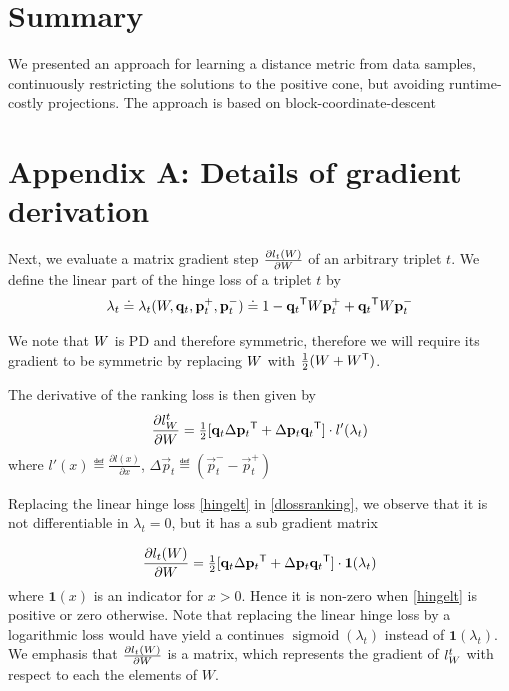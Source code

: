 \documentclass{article}
\begin{document}
{\section{Summary}
We presented an approach for learning a distance metric from data samples,  continuously restricting the solutions to the positive cone, but avoiding runtime-costly projections. The approach is based on block-coordinate-descent




\appendix
\section*{Appendix A: Details of gradient derivation}

Next, we evaluate a matrix gradient step  $\frac{\partial {l_t ({W})}}{\partial {W}}$ of an arbitrary triplet $t$. We define the linear part of the hinge loss of a triplet $t$ by
\begin{equation}
\lambda_t \doteq \lambda_t({W}, \mathbf{q}_t, \mathbf{p}_{t}^{+}, \mathbf{p}_{t}^{-}) \doteq 1-\mathbf{q}_{t}{}^\mathsf{T} {W} \mathbf{p}_{t}^{+}+\mathbf{q}_{t}{}^\mathsf{T}{W}\mathbf{p}_{t}^{-}
\end{equation}

We note that ${W}$ is PD and therefore symmetric, therefore we will require its gradient to be symmetric by replacing ${W}$ with $\tfrac{1}{2}({W} + {W}{}^\mathsf{T})$.

The derivative of the ranking loss is then given by
\begin{equation}
\frac{\partial {l_{{W}}^{t}}}{\partial {W}} = \tfrac{1}{2}[\mathbf{q}_{t}\Delta\mathbf{p}_{t}{}^\mathsf{T}  + \Delta\mathbf{p}_{t}\mathbf{q}_{t}{}^\mathsf{T}]\cdot {l'}(\lambda_t)
\label{dlossranking}
\end{equation} where $l'(x) \eqdef \frac{\partial {l(x)}}{\partial x}$, $\Delta\vec{p}_{t} \eqdef (\vec{p}_{t}^{-} - \vec{p}_{t}^{+})$

Replacing the linear hinge loss \eqref{hingelt} in \eqref{dlossranking}, we observe that it is not differentiable in $\lambda_t = 0$, but it has a sub gradient matrix

\begin{equation}
\frac{\partial {l_t ({W})}}{\partial {W}} = \tfrac{1}{2}[\mathbf{q}_{t}\Delta\mathbf{p}_{t}{}^\mathsf{T}  + \Delta\mathbf{p}_{t}\mathbf{q}_{t}{}^\mathsf{T}] \cdot \textbf{1}(\lambda_t)
\end{equation}
where $\textbf{1}(x)$ is an indicator for $x>0$. Hence it is non-zero when \eqref{hingelt} is positive or zero otherwise. Note that replacing the linear hinge loss by a logarithmic loss would have yield a continues $\operatorname{sigmoid}(\lambda_t)$ instead of $\textbf{1}(\lambda_t)$.  We emphasis that 
$\frac{\partial {l_t ({W})}}{\partial {W}}$ is a matrix, which represents the gradient of $l_{{W}}^{t}$ with respect to each the elements of $W$.

}
\end{document}
